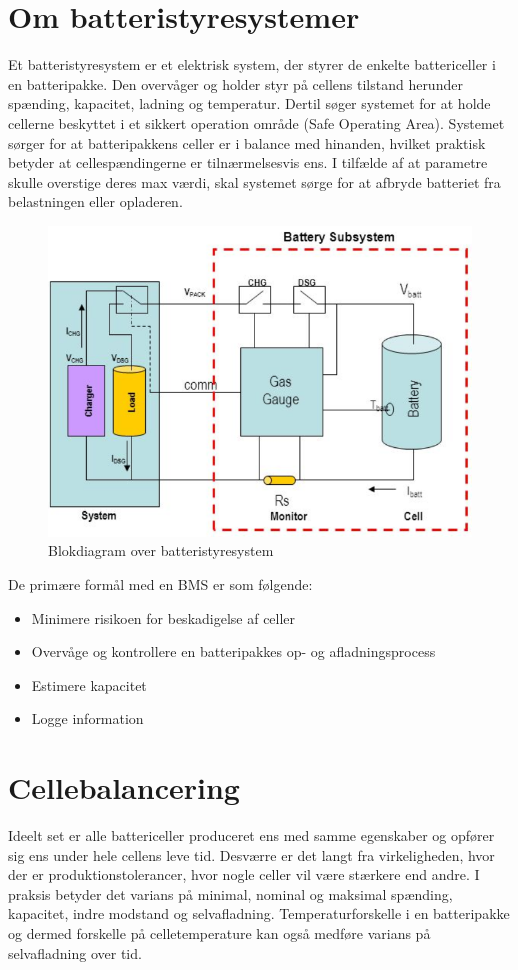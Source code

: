 \section{Om batteristyresystemer}
Et batteristyresystem er et elektrisk system, der styrer de enkelte battericeller i en batteripakke. Den overvåger og holder styr på cellens tilstand herunder spænding, kapacitet, ladning og temperatur. Dertil søger systemet for at holde cellerne beskyttet i et sikkert operation område (Safe Operating Area). Systemet sørger for at batteripakkens celler er i balance med hinanden, hvilket praktisk betyder at cellespændingerne er tilnærmelsesvis ens. I tilfælde af at parametre skulle overstige deres max værdi, skal systemet sørge for at afbryde batteriet fra belastningen eller opladeren.
\\
\begin{figure}[h]
	\centering
	\includegraphics[width=12cm]{billeder/battery_management_block.png}
	\caption{Blokdiagram over batteristyresystem}
	\label{fig:battery_management_block}
\end{figure}

De primære formål med en BMS er som følgende:
\begin{itemize}[noitemsep]
	\item Minimere risikoen for beskadigelse af celler
	\item Overvåge og kontrollere en batteripakkes op- og afladningsprocess
	\item Estimere kapacitet
	\item Logge information
\end{itemize}




\section{Cellebalancering}
Ideelt set er alle battericeller produceret ens med samme egenskaber og opfører sig ens under hele cellens leve tid. Desværre er det langt fra virkeligheden, hvor der er produktionstolerancer, hvor nogle celler vil være stærkere end andre. I praksis betyder det varians på minimal, nominal og maksimal spænding, kapacitet, indre modstand og selvafladning.
Temperaturforskelle i en batteripakke og dermed forskelle på celletemperature kan også medføre varians på selvafladning over tid.
\\

